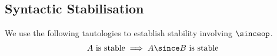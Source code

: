 



\subsection{Syntactic Stabilisation}
We use the following tautologies to establish stability involving $\sinceop$.
\[
\begin{array}{l}
  A~\text{is stable} \implies A \since B ~\text{is stable}
\end{array}
\]


% 
